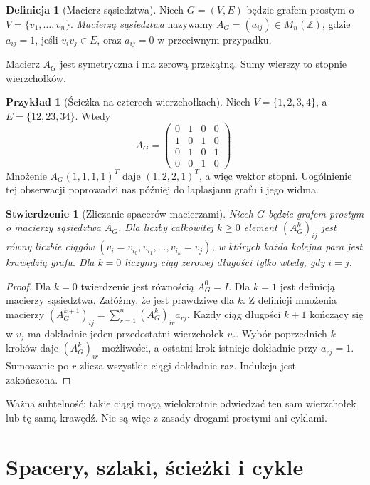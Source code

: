 \documentclass[11pt,a4paper]{report}
\numberwithin{equation}{section}
\theoremstyle{plain}
\newtheorem{stwierdzenie}[twierdzenie]{Stwierdzenie}
\theoremstyle{definition}
\newtheorem{definicja}[twierdzenie]{Definicja}
\newtheorem{przyklad}[twierdzenie]{Przykład}
\theoremstyle{remark}
\begin{document}
\begin{definicja}[Macierz sąsiedztwa]
Niech $G=(V,E)$ będzie grafem prostym o
$V=\{v_1,\ldots,v_n\}$. \emph{Macierzą sąsiedztwa}
nazywamy $A_G=(a_{ij})\in M_n(\mathbb Z)$,
gdzie $a_{ij}=1$, jeśli $v_iv_j\in E$, oraz
$a_{ij}=0$ w przeciwnym przypadku.
\end{definicja}

Macierz $A_G$ jest symetryczna i ma zerową przekątną.
Sumy wierszy to stopnie wierzchołków.

\begin{przyklad}[Ścieżka na czterech wierzchołkach]
Niech $V=\{1,2,3,4\}$, a $E=\{12,23,34\}$.
Wtedy
\[
A_G=\begin{pmatrix}
0&1&0&0\\1&0&1&0\\0&1&0&1\\0&0&1&0
\end{pmatrix}.
\]
Mnożenie $A_G(1,1,1,1)^T$ daje $(1,2,2,1)^T$,
a więc wektor stopni. Uogólnienie tej obserwacji
poprowadzi nas później do laplasjanu grafu i
jego widma.
\end{przyklad}

\begin{stwierdzenie}[Zliczanie spacerów macierzami]
Niech $G$ będzie grafem prostym o macierzy sąsiedztwa
$A_G$. Dla liczby całkowitej $k\ge0$ element
$(A_G^k)_{ij}$ jest równy liczbie ciągów
$(v_i=v_{i_0},v_{i_1},\ldots,v_{i_k}=v_j)$,
w których każda kolejna para jest krawędzią grafu.
Dla $k=0$ liczymy ciąg zerowej długości tylko wtedy,
gdy $i=j$.
\end{stwierdzenie}

\begin{proof}
Dla $k=0$ twierdzenie jest równością $A_G^0=I$.
Dla $k=1$ jest definicją macierzy sąsiedztwa.
Załóżmy, że jest prawdziwe dla $k$. Z definicji
mnożenia macierzy
$(A_G^{k+1})_{ij}=\sum_{r=1}^n(A_G^k)_{ir}a_{rj}$.
Każdy ciąg długości $k+1$ kończący się w $v_j$
ma dokładnie jeden przedostatni wierzchołek $v_r$.
Wybór poprzednich $k$ kroków daje $(A_G^k)_{ir}$
możliwości, a ostatni krok istnieje dokładnie przy
$a_{rj}=1$. Sumowanie po $r$ zlicza wszystkie
ciągi dokładnie raz. Indukcja jest zakończona.
\end{proof}

Ważna subtelność: takie ciągi mogą wielokrotnie odwiedzać
ten sam wierzchołek lub tę samą krawędź. Nie są więc z zasady
drogami prostymi ani cyklami.

\section{Spacery, szlaki, ścieżki i cykle}
\label{sec:tg-drogi}
\end{document}
